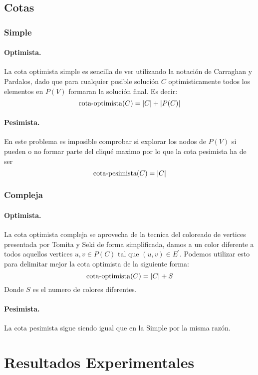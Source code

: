 \documentclass{article}
\DeclarePairedDelimiter\abs{\lvert}{\rvert}%
\begin{document}
\subsection{Cotas}
\subsubsection{Simple}
\paragraph{Optimista.} La cota optimista simple es sencilla de ver utilizando la notación de Carraghan y Pardalos, dado que para cualquier posible solución $C$ optimisticamente todos los elementos en $P(V)$ formaran la solución final. Es decir:
\[ \text{cota-optimista}(C) = \abs{C} + \abs{P(C)} \]
\paragraph{Pesimista.} En este problema es imposible comprobar si explorar los nodos de $P(V)$ si pueden o no formar parte del cliqué maximo por lo que la cota pesimista ha de ser
\[ \text{cota-pesimista}(C) = \abs{C} \]
\subsubsection{Compleja}
\paragraph{Optimista.} La cota optimista compleja se aprovecha de la tecnica del coloreado de vertices presentada por Tomita y Seki \cite{tom} de forma simplificada, damos a un color diferente a todos aquellos vertices $u, v \in P(C)$ tal que $(u, v) \in E^\prime$.
Podemos utilizar esto para delimitar mejor la cota optimista de la siguiente forma:
\[ \text{cota-optimista}(C) = \abs{C} + S\]
Donde $S$ es el numero de colores diferentes.
\paragraph{Pesimista.} La cota pesimista sigue siendo igual que en la Simple por la misma razón.  
\section{Resultados Experimentales}
\end{document}

